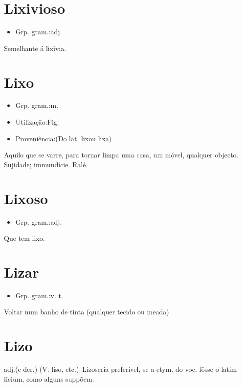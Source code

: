 \section{Lixivioso}
\begin{itemize}
\item {Grp. gram.:adj.}
\end{itemize}
Semelhante á lixívia.
\section{Lixo}
\begin{itemize}
\item {Grp. gram.:m.}
\end{itemize}
\begin{itemize}
\item {Utilização:Fig.}
\end{itemize}
\begin{itemize}
\item {Proveniência:(Do lat. \textunderscore lix\textunderscore  ou \textunderscore lixa\textunderscore )}
\end{itemize}
Aquilo que se varre, para tornar limpa uma casa, um móvel, qualquer objecto.
Sujidade; immundície.
Ralé.
\section{Lixoso}
\begin{itemize}
\item {Grp. gram.:adj.}
\end{itemize}
Que tem lixo.
\section{Lizar}
\begin{itemize}
\item {Grp. gram.:v. t.}
\end{itemize}
Voltar num banho de tinta (qualquer tecido ou meada)
\section{Lizo}
\textunderscore adj.\textunderscore  (e der.)
(V. \textunderscore liso\textunderscore , etc.)--\textunderscore Lizo\textunderscore  seria preferível, se a etym. do voc. fôsse o latim \textunderscore licium\textunderscore , como alguns suppõem.
